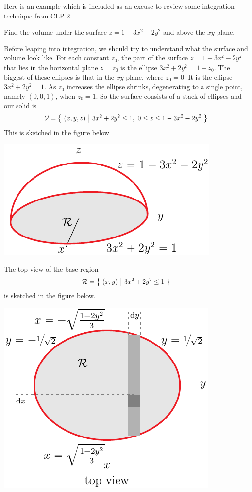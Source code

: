 Here is an example which is included as an excuse to review
some integration technique from CLP-2. 
\begin{eg}\label{eg dblInt F}
Find the volume under the surface $z=1-3x^2-2y^2$ and above the $xy$-plane. 

\soln 
Before leaping into integration, we should try to understand what the surface
and volume look like.
For each constant $z_0$, the part of the surface $z=1-3x^2-2y^2$
that lies in the horizontal plane $z=z_0$ is the ellipse
$3x^2+2y^2=1-z_0$. The biggest of these ellipses is that in the
$xy$-plane, where $z_0=0$. It is the ellipse $3x^2+2y^2=1$.
As $z_0$ increases the ellipse shrinks, degenerating to a single
point, namely $(0,0,1)$, when $z_0=1$. So the surface consists 
of a stack of ellipses and our solid is
\begin{equation*}
\mathcal{V} =\big\{ \ (x,y,z)\ \big|\ 3x^2+2y^2\le 1,\ 0\le z\le 1-3x^2-2y^2\ \big\}
\end{equation*}
This is sketched in the figure below
\begin{efig}
\begin{center}
   \includegraphics{egDblIntEa.pdf}
\end{center}
\end{efig}
The top view of the base region 
\begin{equation*}
\mathcal{R}=\big\{ \ (x,y)\ \big|\ 3x^2+2y^2\le 1\ \big\}
\end{equation*}
is sketched in the figure below.
 \begin{efig}
\begin{center}
   \includegraphics{egDblIntEb.pdf}
\end{center}
\end{efig}


\end{eg}
